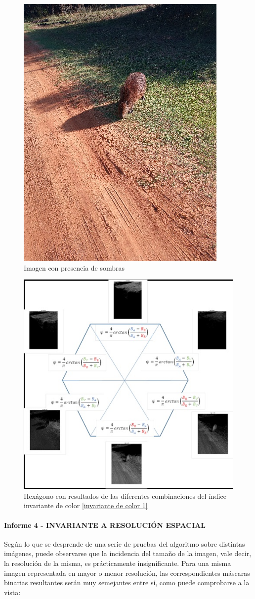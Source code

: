 \begin{figure}[H]
    \centering
    \includegraphics[width=0.5\linewidth]{Imagenes//Informes/info3_colon.JPG}
    \caption{Imagen con presencia de sombras}
    \label{colon}
\end{figure}

\begin{figure}[H]
    \centering
    \includegraphics[width=0.5\linewidth]{Imagenes//Informes/info3_hexagono4.JPG}
    \caption{Hexágono con resultados de las diferentes combinaciones del índice invariante de color \ref{invariante de color 1}}
    \label{hexagono4}
\end{figure}

\paragraph{Informe 4 - INVARIANTE A RESOLUCIÓN ESPACIAL}
 Según lo que se desprende de una serie de pruebas del algoritmo sobre distintas imágenes, puede observarse que la incidencia del tamaño de la imagen, vale decir, la resolución de la misma, es prácticamente insignificante. Para una misma imagen representada en mayor o menor resolución, las correspondientes máscaras binarias resultantes serán muy semejantes entre sí, como puede comprobarse a la vista:

